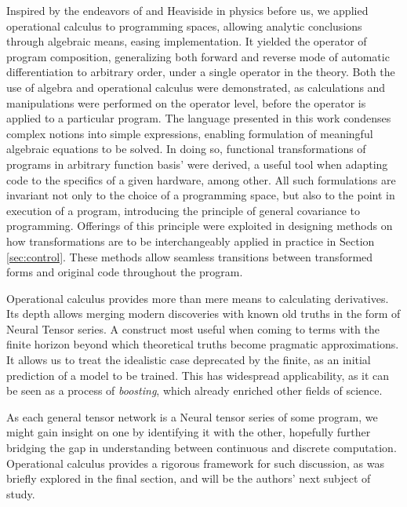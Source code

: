 \documentclass[11pt]{article}
\begin{document}
Inspired by the endeavors of \cite{Feynman} and
Heaviside \citep[see][]{HeavisideOperational} in physics before us, we applied operational
calculus to programming spaces, allowing analytic conclusions through algebraic
means, easing implementation. It yielded the operator of program composition,
generalizing both forward and reverse mode of
automatic differentiation to arbitrary order, under a single operator in the
theory. Both the use of algebra and operational calculus were demonstrated, as
calculations and manipulations were performed on the operator level, before the
operator is applied to a particular program.
The language presented in this work condenses complex notions into simple expressions, enabling
formulation of meaningful algebraic equations to be solved. In doing so,
functional transformations of programs in arbitrary function basis' were
derived, a useful tool when adapting code to the specifics of a given hardware,
among other. 
All such formulations are invariant not only to the choice of a programming
space, but also to the point in execution of a program, introducing the
principle of general covariance to programming.
Offerings of this principle were exploited in designing methods on how
transformations are to be interchangeably applied in practice in Section
\ref{sec:control}. These methods allow seamless transitions between transformed
forms and original code throughout the program. 

Operational calculus provides more than mere means to calculating derivatives.
Its depth allows merging modern discoveries with known old truths in the form of
Neural Tensor series. A construct most useful when coming to terms with the
finite horizon beyond which theoretical truths become pragmatic approximations.
It allows us to treat the idealistic case deprecated by the finite, as an
initial prediction of a model to be trained.  This has widespread applicability,
as it can be seen as a process of \emph{boosting}, which already
enriched other fields of science.  

As each general tensor network is a Neural tensor series of some program, we
might gain insight on one by identifying it with the other, 
hopefully further bridging the gap in understanding between continuous and
discrete computation. 
 Operational calculus provides a rigorous framework for such discussion, as was
 briefly explored in the final section, and will be the authors' next subject of
 study. 
\clearpage

%

\end{document}
